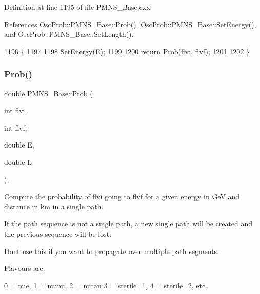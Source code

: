Definition at line 1195 of file P\+M\+N\+S\+\_\+\+Base.\+cxx.



References Osc\+Prob\+::\+P\+M\+N\+S\+\_\+\+Base\+::\+Prob(), Osc\+Prob\+::\+P\+M\+N\+S\+\_\+\+Base\+::\+Set\+Energy(), and Osc\+Prob\+::\+P\+M\+N\+S\+\_\+\+Base\+::\+Set\+Length().


\begin{DoxyCode}
1196 \{
1197 
1198   \hyperlink{classOscProb_1_1PMNS__Base_a95b3b0d0cab5e6a54b5ef99587f837c0}{SetEnergy}(E);
1199 
1200   \textcolor{keywordflow}{return} \hyperlink{classOscProb_1_1PMNS__Base_a63f6450914b2ef712fbdc45787d9a27f}{Prob}(flvi, flvf);
1201 
1202 \}
\end{DoxyCode}
\mbox{\label{classOscProb_1_1PMNS__Base_a6e0a74508d9d6db7be02e242b8467563}} 
\subsubsection{\texorpdfstring{Prob()}{Prob()}\hspace{0.1cm}{\footnotesize\ttfamily [6/6]}}
{\footnotesize\ttfamily double P\+M\+N\+S\+\_\+\+Base\+::\+Prob (\begin{DoxyParamCaption}\item[{int}]{flvi,  }\item[{int}]{flvf,  }\item[{double}]{E,  }\item[{double}]{L }\end{DoxyParamCaption})\hspace{0.3cm}{\ttfamily [virtual]}, {\ttfamily [inherited]}}

Compute the probability of flvi going to flvf for a given energy in GeV and distance in km in a single path.

If the path sequence is not a single path, a new single path will be created and the previous sequence will be lost.

Don\textquotesingle{}t use this if you want to propagate over multiple path segments.

Flavours are\+: 
\begin{DoxyPre}
  0 = nue, 1 = numu, 2 = nutau
  3 = sterile\_1, 4 = sterile\_2, etc.
\end{DoxyPre}
 
